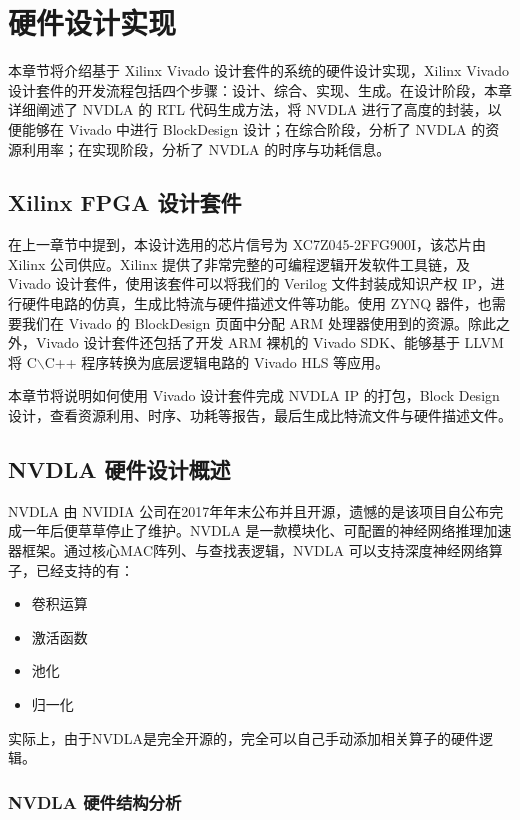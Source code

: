 \chapter{硬件设计实现}\label{chap:hardware}

本章节将介绍基于 Xilinx Vivado 设计套件的系统的硬件设计实现，Xilinx Vivado 设计套件的开发流程包括四个步骤：设计、综合、实现、生成。在设计阶段，本章详细阐述了 NVDLA 的 RTL 代码生成方法，将 NVDLA 进行了高度的封装，以便能够在 Vivado 中进行 BlockDesign 设计；在综合阶段，分析了 NVDLA 的资源利用率；在实现阶段，分析了 NVDLA 的时序与功耗信息。

\section{Xilinx FPGA 设计套件}

在上一章节中提到，本设计选用的芯片信号为 XC7Z045-2FFG900I，该芯片由 Xilinx 公司供应。Xilinx 提供了非常完整的可编程逻辑开发软件工具链，及 Vivado 设计套件，使用该套件可以将我们的 Verilog 文件封装成知识产权 IP，进行硬件电路的仿真，生成比特流与硬件描述文件等功能。使用 ZYNQ 器件，也需要我们在 Vivado 的 BlockDesign 页面中分配 ARM 处理器使用到的资源。除此之外，Vivado 设计套件还包括了开发 ARM 裸机的 Vivado SDK、能够基于 LLVM 将 C$\backslash$C++ 程序转换为底层逻辑电路的 Vivado HLS 等应用。

本章节将说明如何使用 Vivado 设计套件完成 NVDLA IP 的打包，Block Design 设计，查看资源利用、时序、功耗等报告，最后生成比特流文件与硬件描述文件。 

\section{NVDLA 硬件设计概述}

NVDLA 由 NVIDIA 公司在2017年年末公布并且开源，遗憾的是该项目自公布完成一年后便草草停止了维护。NVDLA 是一款模块化、可配置的神经网络推理加速器框架。通过核心MAC阵列、与查找表逻辑，NVDLA 可以支持深度神经网络算子，已经支持的有：

\begin{itemize}
    \item 卷积运算
    \item 激活函数
    \item 池化
    \item 归一化
\end{itemize}

实际上，由于NVDLA是完全开源的，完全可以自己手动添加相关算子的硬件逻辑。

\subsection{NVDLA 硬件结构分析}

